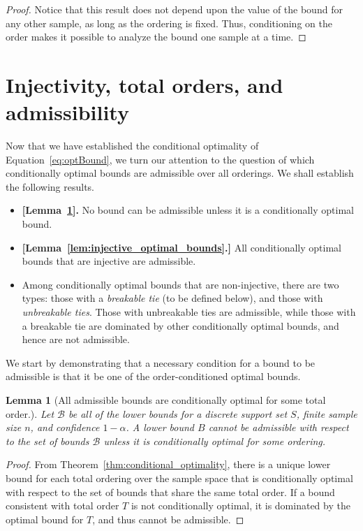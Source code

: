 \documentclass{article}
\newtheorem{lemma}[theorem]{Lemma}
\theoremstyle{definition}
\theoremstyle{remark}
\begin{document}
\begin{proof}
Notice that this result does not depend upon the value of the bound for any other sample, as long as the ordering is fixed. Thus, conditioning on the order makes it possible to analyze the bound one sample at a time.
\end{proof}

\section{Injectivity, total orders, and admissibility}
\label{sec:adm_inj_total}
Now that we have established the conditional optimality of Equation~\ref{eq:optBound}, we turn our attention to the question of which conditionally optimal bounds are admissible over all orderings. We shall establish the following results.
\begin{itemize}
    \item \textbf{[Lemma~\ref{lem:admissible_bounds}].} No bound can be admissible unless it is a conditionally optimal bound.
    \item \textbf{[Lemma~\ref{lem:injective_optimal_bounds}.]} All conditionally optimal bounds that are injective are admissible.
    \item Among conditionally optimal bounds that are non-injective, there are two types: those with a \textit{breakable tie} (to be defined below), and those with \textit{unbreakable ties}. Those with unbreakable ties are admissible, while those with a breakable tie are dominated by other conditionally optimal bounds, and hence are not admissible.
\end{itemize}
We start by demonstrating that a necessary condition for a bound to be admissible is that it be one of the order-conditioned optimal bounds. 

\begin{lemma}[All admissible bounds are conditionally optimal for some total order.]
\label{lem:admissible_bounds}
Let $\mathcal{B}$ be all of the lower bounds for a discrete support set $S$, finite sample size $n$, and confidence $1-\alpha$. A lower bound $B$ cannot be admissible with respect to the set of bounds $\mathcal{B}$ unless it is conditionally optimal for some ordering.
\end{lemma}
\begin{proof}
 From Theorem~\ref{thm:conditional_optimality}, there is a unique lower bound for each total ordering over the sample space that is conditionally optimal with respect to the set of bounds that share the same total order.  If a bound consistent with total order $T$ is not conditionally optimal, it is dominated by the optimal bound for $T$, and thus cannot be admissible.
\end{proof}
\end{document}
